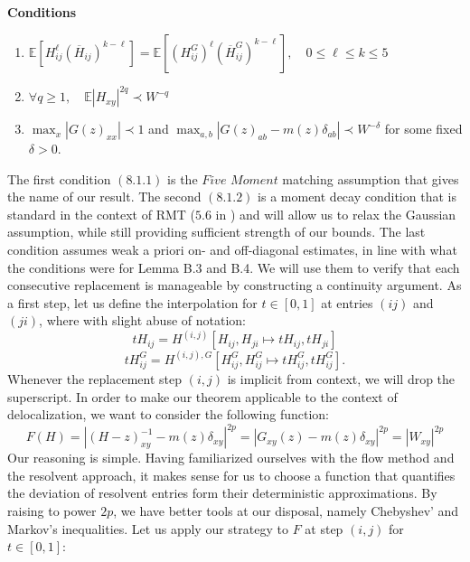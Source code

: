 \documentclass[11pt]{article}
\newenvironment{boxt}[1]
  {\begin{mdframed}\noindent\textbf{#1}\normalfont\space}
  {\end{mdframed}}
\begin{document}
\begin{boxt}{Conditions}
\begin{enumerate}[label=(8.1.\arabic*),align=left, leftmargin=30pt, labelwidth=25pt, labelsep=5pt]\label{8.1.1}
\item $\mathbb{E}\left[H_{ij}^\ell \left(\overline{H}_{ij}\right)^{k-\ell}\right] = \mathbb{E}\left[\left(H_{ij}^G\right)^\ell \left(\overline{H}_{ij}^G\right)^{k-\ell}\right], \quad 0\leq \ell\leq k\leq 5$\label{8.1.2}
\item $\forall q\geq 1, \quad \mathbb{E}\left\vert H_{xy}\right\vert ^{2q}\prec W^{-q}$
\item $\max_x|G(z)_{xx}|\prec 1$ and $\max_{a, b}|G(z)_{ab}-m(z)\delta_{ab}|\prec W^{-\delta}$ for some fixed $\delta>0$. \label{8.1.3}
\end{enumerate}
\end{boxt}
The first condition $(8.1.1)$ is the $\textit{Five Moment}$ matching assumption that gives the name of our result. The second $(8.1.2)$ is a moment decay condition that is standard in the context of RMT ($5.6$ in \cite{dynamic}) and will allow us to relax the Gaussian assumption, while still providing sufficient strength of our bounds. The last condition assumes weak a priori on- and off-diagonal estimates, in line with what the conditions were for Lemma B.3 and B.4. We will use them to verify that each consecutive replacement is manageable by constructing a continuity argument. As a first step, let us define the interpolation for $t\in [0, 1]$ at entries $(ij)$ and $(ji)$, where with slight abuse of notation:
$$tH_{ij} = H^{(i, j)}[H_{ij}, H_{ji}\mapsto t H_{ij}, tH_{ji}]$$
$$tH_{ij}^{G} = H^{(i, j),G}[H^G_{ij}, H^G_{ij}\mapsto t H^G_{ij}, t H^{G}_{ij}].$$
Whenever the replacement step $(i, j)$ is implicit from context, we will drop the superscript. In order to make our theorem applicable to the context of delocalization, we want to consider the following function: 
\begin{equation*}\label{8.3}
F(H) = \left\vert
(H-z)_{xy}^{-1} - m(z)\delta_{xy}
\right\vert ^{2p} = \left\vert 
G_{xy}(z)-m(z)\delta_{xy}
\right\vert ^{2p} = |W_{xy}|^{2p}\tag{8.3}
\end{equation*}
Our reasoning is simple. Having familiarized ourselves with the flow method and the resolvent approach, it makes sense for us to choose a function that quantifies the deviation of resolvent entries form their deterministic approximations. By raising to power $2p$, we have better tools at our disposal, namely Chebyshev' and Markov's inequalities. Let us apply our strategy to $F$ at step $(i,j)$ for $t\in [0, 1]$: 
\end{document}
